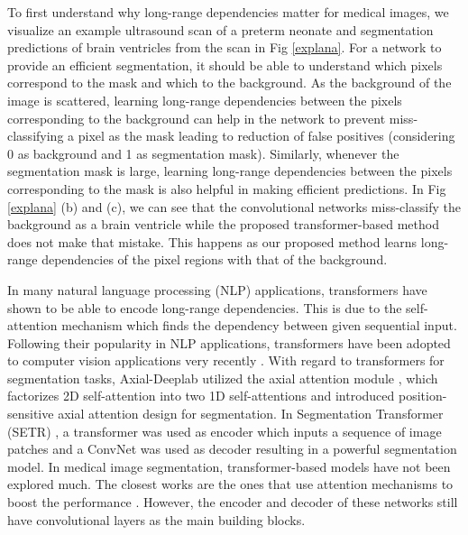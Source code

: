 \documentclass[runningheads]{llncs}
\begin{document}
	 
	To first understand why long-range dependencies matter for medical images, we visualize an example ultrasound scan of a preterm neonate and segmentation predictions of brain ventricles from the scan in Fig \ref{explana}. For a network to provide an efficient segmentation, it should be able to understand which pixels correspond to the mask and which to the background. As the background of the image is scattered, learning long-range dependencies between the pixels corresponding to the background can help in the network to prevent miss-classifying a pixel as the mask leading to reduction of false positives (considering 0 as background and 1 as segmentation mask). Similarly, whenever the segmentation mask is large, learning long-range dependencies between the pixels corresponding to the mask is also helpful in making efficient predictions. In Fig \ref{explana} (b) and (c), we can see that the convolutional networks miss-classify the background as a brain ventricle while the proposed transformer-based method does not make that mistake. This happens as our proposed method learns long-range dependencies of the pixel regions with that of the background.   
    
	 


	 In many natural language processing (NLP) applications, transformers \cite{devlin2018bert} have shown to be able to encode long-range dependencies. This is due to the self-attention mechanism which finds the dependency between given sequential input. Following their popularity in NLP applications, transformers have been adopted to computer vision applications very recently \cite{dosovitskiy2020image,touvron2020training}. With regard to transformers for segmentation tasks, Axial-Deeplab \cite{wang2020axial} utilized the axial attention module \cite{ho2019axial}, which factorizes 2D self-attention into two 1D self-attentions and introduced position-sensitive axial attention design for segmentation. In Segmentation Transformer (SETR) \cite{zheng2020rethinking}, a transformer was used as encoder which inputs a sequence of image patches and a ConvNet was used as decoder resulting in a powerful segmentation model. In medical image segmentation, transformer-based models have not been explored much. The closest works are the ones that use attention mechanisms to boost the performance  \cite{oktay2018attention,wang2019volumetric}. However, the encoder and decoder of these networks still have convolutional layers as the main building blocks.  
	 
\end{document}
